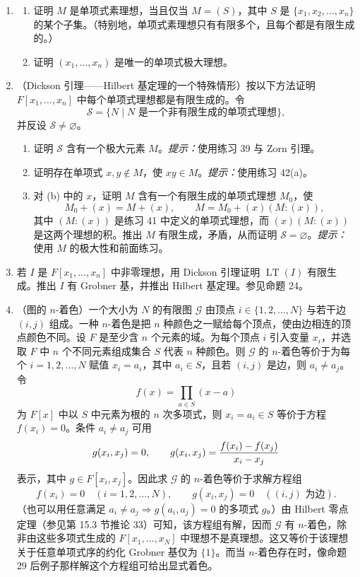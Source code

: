 \begin{enumerate}[label=\arabic*.]
	\item 
	\begin{enumerate}[label=(\alph*)]
		\item 证明 $M$ 是单项式素理想，当且仅当 $M=(S)$，其中 $S$ 是 $\{x_1,x_2,\ldots,x_n\}$ 的某个子集。（特别地，单项式素理想只有有限多个，且每个都是有限生成的。）
		\item 证明 $(x_1,
		\ldots,x_n)$ 是唯一的单项式极大理想。
	\end{enumerate}
	
	\item （Dickson 引理——Hilbert 基定理的一个特殊情形）按以下方法证明 $F[x_1,
	\ldots,x_n]$ 中每个单项式理想都是有限生成的。令
	\[
	\mathcal S=\{N\mid N\text{ 是一个非有限生成的单项式理想}\},
	\]
	并反设 $\mathcal S\neq\varnothing$。
	\begin{enumerate}[label=(\alph*)]
		\item 证明 $\mathcal S$ 含有一个极大元素 $M$。\emph{提示：}使用练习 39 与 Zorn 引理。
		\item 证明存在单项式 $x,y\notin M$，使 $xy\in M$。\emph{提示：}使用练习 42(a)。
		\item 对 (b) 中的 $x$，证明 $M$ 含有一个有限生成的单项式理想 $M_0$，使
		\[
		M_0+(x)=M+(x),
		\qquad
		M=M_0+(x)(M:(x)),
		\]
		其中 $(M:(x))$ 是练习 41 中定义的单项式理想，而 $(x)(M:(x))$ 是这两个理想的积。推出 $M$ 有限生成，矛盾，从而证明 $\mathcal S=\varnothing$。\emph{提示：}使用 $M$ 的极大性和前面练习。
	\end{enumerate}
	
	\item 若 $I$ 是 $F[x_1,
	\ldots,x_n]$ 中非零理想，用 Dickson 引理证明 $\operatorname{LT}(I)$ 有限生成。推出 $I$ 有 Grobner 基，并推出 Hilbert 基定理。参见命题 24。
	
	\item （图的 $n$-着色）一个大小为 $N$ 的有限图 $\mathcal G$ 由顶点 $i\in\{1,2,
	\ldots,N\}$ 与若干边 $(i,j)$ 组成。一种 $n$-着色是把 $n$ 种颜色之一赋给每个顶点，使由边相连的顶点颜色不同。设 $F$ 是至少含 $n$ 个元素的域。为每个顶点 $i$ 引入变量 $x_i$，并选取 $F$ 中 $n$ 个不同元素组成集合 $S$ 代表 $n$ 种颜色。则 $\mathcal G$ 的 $n$-着色等价于为每个 $i=1,2,
	\ldots,N$ 赋值 $x_i=a_i$，其中 $a_i\in S$，且若 $(i,j)$ 是边，则 $a_i\neq a_j$。令
	\[
	f(x)=\prod_{a\in S}(x-a)
	\]
	为 $F[x]$ 中以 $S$ 中元素为根的 $n$ 次多项式，则 $x_i=a_i\in S$ 等价于方程 $f(x_i)=0$。条件 $a_i\neq a_j$ 可用
	\[
	g(x_i,x_j)=0,
	\qquad
	g(x_i,x_j)={f(x_i)-f(x_j)\over x_i-x_j}
	\]
	表示，其中 $g\in F[x_i,x_j]$。因此求 $\mathcal G$ 的 $n$-着色等价于求解方程组
	\[
	f(x_i)=0 \quad (i=1,2,
	\ldots,N),
	\qquad
	g(x_i,x_j)=0 \quad ((i,j)\text{ 为边}).
	\]
	（也可以用任意满足 $a_i\neq a_j\Rightarrow g(a_i,a_j)=0$ 的多项式 $g$。）由 Hilbert 零点定理（参见第 15.3 节推论 33）可知，该方程组有解，因而 $\mathcal G$ 有 $n$-着色，除非由这些多项式生成的 $F[x_1,
	\ldots,x_N]$ 中理想不是真理想。这又等价于该理想关于任意单项式序的约化 Grobner 基仅为 $\{1\}$。而当 $n$-着色存在时，像命题 29 后例子那样解这个方程组可给出显式着色。
	

\end{enumerate}

